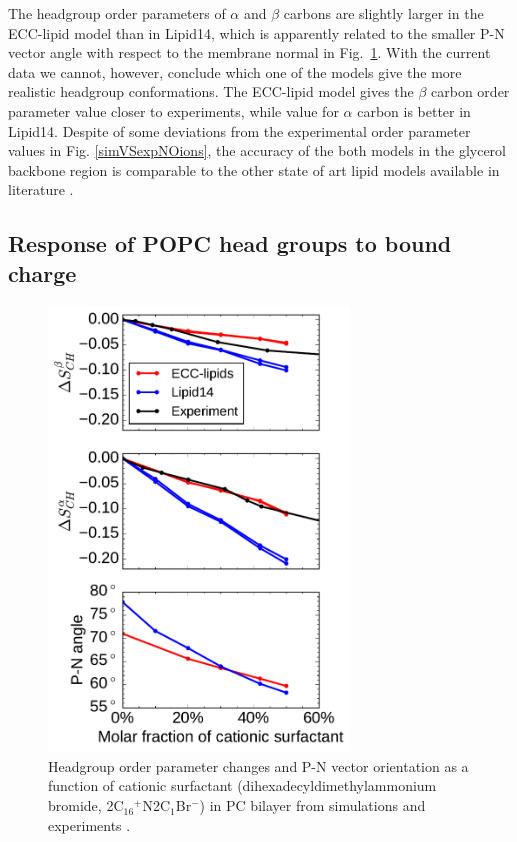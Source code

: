 \documentclass[aip,jcp,twocolumn]{revtex4}
\begin{document}
The headgroup order parameters of $\alpha$ and $\beta$ carbons are slightly larger
in the ECC-lipid model than in Lipid14, which is apparently related to the
smaller P-N vector angle with respect to the membrane normal in
Fig.~\ref{OrderParameterCHANGESsurf}. With the current data we cannot,
however, conclude which one of the models give the more realistic
headgroup conformations. The ECC-lipid model gives
the $\beta$ carbon order parameter value closer to experiments, while
value for $\alpha$ carbon is better in Lipid14.
Despite of some deviations from the experimental order parameter values
in Fig. \ref{simVSexpNOions},
the accuracy of the both models in the glycerol backbone region
is comparable to the other state
of art lipid models available in literature \cite{botan15}.



\subsection{Response of POPC head groups to bound charge}

\begin{figure}[tbp]
  \centering
  \includegraphics[width=8.0cm]{../Fig/ipython_nb/PN_angle_OrdPars-A-B_L14-ECCL17_q80_sig89_surf.pdf}
  \caption{\label{OrderParameterCHANGESsurf}
    Headgroup order parameter changes and P-N vector orientation as a function of
    cationic surfactant (dihexadecyldimethylammonium bromide, 2C$_{16}$$^+$N2C$_1$Br$^-$)
    in PC bilayer from simulations and experiments \cite{scherer89}.
  }
\end{figure}
\end{document}
